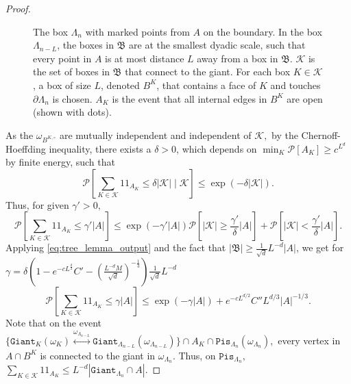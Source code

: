 \documentclass[article,11pt,reqno]{amsart}
\newcommand{\id}{1\! \!1}
\begin{document}
\begin{appendix}
\begin{proof}
\begin{figure}
    \caption{The box $\Lambda_n$ with marked points from $A$ on the boundary. In the box $\Lambda_{n-L}$, the boxes in $\mathfrak{B}$ are at the smallest dyadic scale, such that every point in $A$ is at most distance $L$ away from a box in $\mathfrak{B}$. $\mathcal{K}$ is the set of boxes in $\mathfrak{B}$ that connect to the giant. For each box $K\in \mathcal{K}$, a box of size $L$, denoted $B^{K}$, that contains a face of $K$ and touches $\partial \Lambda_n$ is chosen.  $A_K$ is the event that all internal edges in $B^{K}$ are open (shown with dots).} 
    \label{fig:skydeskive}
\end{figure}



 As the $\omega_{B^{K,\circ}}$ are mutually independent and independent of $\mathcal{K},$ by the Chernoff-Hoeffding inequality, there exists a $\delta >0$, which depends on $\min_K\mathscr{P}[A_K]\geq c^{L^d}$ by finite energy, such that 
$$
\mathscr{P}[ \sum_{K\in \mathcal{K}} \id_{A_K}\leq \delta |\mathcal{K}| \mid \mathcal{K}]\leq \exp(- \delta |\mathcal{K}|).
$$
Thus, for given $\gamma'>0,$
$$
\mathscr{P}\left[ \sum_{K\in \mathcal{K}} \id_{A_K}\leq \gamma' |A| \right]
\leq  \exp(-\gamma' |A|)\mathscr{P}\left[|\mathcal{K}|\geq \frac{\gamma'}{\delta}|A|\right]+\mathscr{P}\left[|\mathcal{K}|< \frac{\gamma'}{\delta}|A|\right].
$$
Applying \eqref{eq:tree_lemma_output} and the fact that $|\mathfrak{B}|\geq \frac{1}{\sqrt{d}}L^{-d}|A|$, we get for $\gamma = \delta \left(1- e^{-cL^\frac{d}{2}} C' - (\frac{L^{-d}M}{\sqrt{d}})^{-\frac{1}{3}} \right) \frac{1}{\sqrt{d}}L^{-d}$
$$
\mathscr{P}\left[ \sum_{K\in \mathcal{K}}\id_{A_K}\leq \gamma|A| \right]\leq \exp(-\gamma |A|)+e^{-cL^{d/2}}C'' L^{d/3} |A|^{-1/3}.
$$
Note that on the event $\{\mathtt{Giant}_K(\omega_K)\overset{\omega_{\Lambda_{n-L}}}{\longleftrightarrow}\mathtt{Giant}_{\Lambda_{n-L}}(\omega_{\Lambda_{n-L}})\}\cap A_K\cap \mathtt{Pis}_{\Lambda_n}(\omega_{\Lambda_n}),$ every vertex in $A\cap B^K$ is connected to the giant in $\omega_{\Lambda_n}$. Thus, on $\mathtt{Pis}_{\Lambda_n},$ $\sum_{K\in \mathcal{K}}\id_{A_K}\leq L^{-d}|\mathtt{Giant}_{\Lambda_{n}}\cap A|.$


\end{proof}
\end{appendix}
\end{document}
